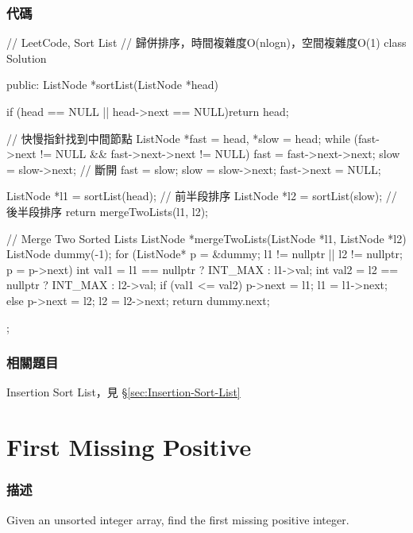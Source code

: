 \subsubsection{代碼}
\begin{Code}
// LeetCode, Sort List
// 歸併排序，時間複雜度O(nlogn)，空間複雜度O(1)
class Solution {
public:
    ListNode *sortList(ListNode *head) {
        if (head == NULL || head->next == NULL)return head;

        // 快慢指針找到中間節點
        ListNode *fast = head, *slow = head;
        while (fast->next != NULL && fast->next->next != NULL) {
            fast = fast->next->next;
            slow = slow->next;
        }
        // 斷開
        fast = slow;
        slow = slow->next;
        fast->next = NULL;

        ListNode *l1 = sortList(head);  // 前半段排序
        ListNode *l2 = sortList(slow);  // 後半段排序
        return mergeTwoLists(l1, l2);
    }

    // Merge Two Sorted Lists
    ListNode *mergeTwoLists(ListNode *l1, ListNode *l2) {
        ListNode dummy(-1);
        for (ListNode* p = &dummy; l1 != nullptr || l2 != nullptr; p = p->next) {
            int val1 = l1 == nullptr ? INT_MAX : l1->val;
            int val2 = l2 == nullptr ? INT_MAX : l2->val;
            if (val1 <= val2) {
                p->next = l1;
                l1 = l1->next;
            } else {
                p->next = l2;
                l2 = l2->next;
            }
        }
        return dummy.next;
    }
};
\end{Code}


\subsubsection{相關題目}
\begindot
\item Insertion Sort List，見 \S \ref{sec:Insertion-Sort-List}
\myenddot


\section{First Missing Positive} %
\label{sec:first-missing-positive}


\subsubsection{描述}
Given an unsorted integer array, find the first missing positive integer.

